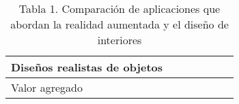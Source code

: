 \begin{table}[h]
\begin{tabular}{|p{3.2cm}|c|c|c|c|p{2.5cm}|c|}
		Diseños realistas de objetos &                          & \cellcolor[HTML]{BFBFBF} & \cellcolor[HTML]{BFBFBF} & \cellcolor[HTML]{BFBFBF} &                          & \cellcolor[HTML]{BFBFBF} \\\hline
		Valor agregado               &                          &                          &                          &                          &                          & \cellcolor[HTML]{BFBFBF} \\\hline
	\end{tabular}
\captionsetup{justification=centering}
\caption*{Tabla 1. Comparación de aplicaciones que abordan la realidad aumentada y el diseño de interiores}
\end{table}

  